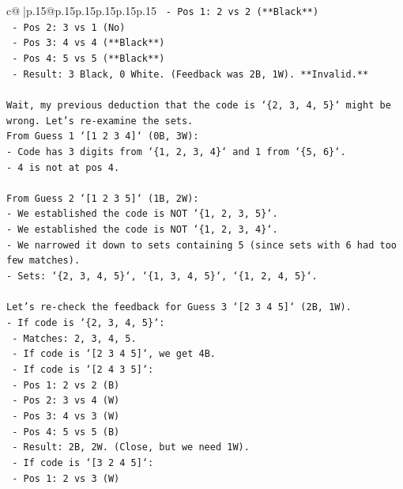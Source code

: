 \documentclass{article}
\begin{document}
{\begin{supertabular}{c@{$\;$}|p{.15\linewidth}@{}p{.15\linewidth}p{.15\linewidth}p{.15\linewidth}p{.15\linewidth}p{.15\linewidth}}
{{{\texttt{   {-} Pos 1: 2 vs 2 (**Black**)} \\
\texttt{   {-} Pos 2: 3 vs 1 (No)} \\
\texttt{   {-} Pos 3: 4 vs 4 (**Black**)} \\
\texttt{   {-} Pos 4: 5 vs 5 (**Black**)} \\
\texttt{   {-} Result: 3 Black, 0 White. (Feedback was 2B, 1W). **Invalid.**} \\
\\ 
\texttt{Wait, my previous deduction that the code is `\{2, 3, 4, 5\}` might be wrong. Let's re{-}examine the sets.} \\
\texttt{From Guess 1 `{[}1 2 3 4{]}` (0B, 3W):} \\
\texttt{{-} Code has 3 digits from `\{1, 2, 3, 4\}` and 1 from `\{5, 6\}`.} \\
\texttt{{-} 4 is not at pos 4.} \\
\\ 
\texttt{From Guess 2 `{[}1 2 3 5{]}` (1B, 2W):} \\
\texttt{{-} We established the code is NOT `\{1, 2, 3, 5\}`.} \\
\texttt{{-} We established the code is NOT `\{1, 2, 3, 4\}`.} \\
\texttt{{-} We narrowed it down to sets containing 5 (since sets with 6 had too few matches).} \\
\texttt{{-} Sets: `\{2, 3, 4, 5\}`, `\{1, 3, 4, 5\}`, `\{1, 2, 4, 5\}`.} \\
\\ 
\texttt{Let's re{-}check the feedback for Guess 3 `{[}2 3 4 5{]}` (2B, 1W).} \\
\texttt{{-} If code is `\{2, 3, 4, 5\}`:} \\
\texttt{  {-} Matches: 2, 3, 4, 5.} \\
\texttt{  {-} If code is `{[}2 3 4 5{]}`, we get 4B.} \\
\texttt{  {-} If code is `{[}2 4 3 5{]}`:} \\
\texttt{    {-} Pos 1: 2 vs 2 (B)} \\
\texttt{    {-} Pos 2: 3 vs 4 (W)} \\
\texttt{    {-} Pos 3: 4 vs 3 (W)} \\
\texttt{    {-} Pos 4: 5 vs 5 (B)} \\
\texttt{    {-} Result: 2B, 2W. (Close, but we need 1W).} \\
\texttt{  {-} If code is `{[}3 2 4 5{]}`:} \\
\texttt{    {-} Pos 1: 2 vs 3 (W)} \\
}}}
\end{supertabular}}
\end{document}
